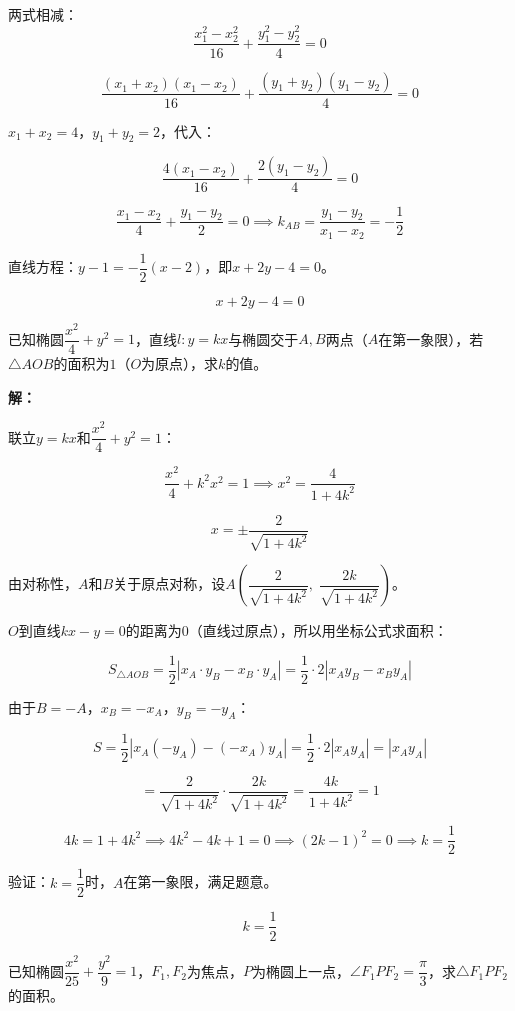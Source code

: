 \documentclass[12pt, a4paper]{ctexart}
\begin{document}
两式相减：
$$\frac{x_1^2 - x_2^2}{16} + \frac{y_1^2 - y_2^2}{4} = 0$$

$$\frac{(x_1+x_2)(x_1-x_2)}{16} + \frac{(y_1+y_2)(y_1-y_2)}{4} = 0$$

$x_1 + x_2 = 4$，$y_1 + y_2 = 2$，代入：

$$\frac{4(x_1 - x_2)}{16} + \frac{2(y_1 - y_2)}{4} = 0$$

$$\frac{x_1 - x_2}{4} + \frac{y_1 - y_2}{2} = 0 \implies k_{AB} = \frac{y_1 - y_2}{x_1 - x_2} = -\frac{1}{2}$$

直线方程：$y - 1 = -\dfrac{1}{2}(x - 2)$，即$x + 2y - 4 = 0$。

$$\boxed{x + 2y - 4 = 0}$$

\begin{examplebox}[【例题9】直线与椭圆交点的面积问题]
已知椭圆$\dfrac{x^2}{4} + y^2 = 1$，直线$l: y = kx$与椭圆交于$A, B$两点（$A$在第一象限），若$\triangle AOB$的面积为$1$（$O$为原点），求$k$的值。
\end{examplebox}

\textbf{解：}

联立$y = kx$和$\dfrac{x^2}{4} + y^2 = 1$：

$$\frac{x^2}{4} + k^2 x^2 = 1 \implies x^2 = \frac{4}{1 + 4k^2}$$

$$x = \pm\frac{2}{\sqrt{1 + 4k^2}}$$

由对称性，$A$和$B$关于原点对称，设$A\left(\dfrac{2}{\sqrt{1+4k^2}},\; \dfrac{2k}{\sqrt{1+4k^2}}\right)$。

$O$到直线$kx - y = 0$的距离为$0$（直线过原点），所以用坐标公式求面积：

$$S_{\triangle AOB} = \frac{1}{2}|x_A \cdot y_B - x_B \cdot y_A| = \frac{1}{2} \cdot 2|x_A y_B - x_B y_A|$$

由于$B = -A$，$x_B = -x_A$，$y_B = -y_A$：

$$S = \frac{1}{2}|x_A(-y_A) - (-x_A)y_A| = \frac{1}{2} \cdot 2|x_A y_A| = |x_A y_A|$$

$$= \frac{2}{\sqrt{1+4k^2}} \cdot \frac{2k}{\sqrt{1+4k^2}} = \frac{4k}{1+4k^2} = 1$$

$$4k = 1 + 4k^2 \implies 4k^2 - 4k + 1 = 0 \implies (2k - 1)^2 = 0 \implies k = \frac{1}{2}$$

验证：$k = \dfrac{1}{2}$时，$A$在第一象限，满足题意。

$$\boxed{k = \dfrac{1}{2}}$$

\begin{examplebox}[【例题10】椭圆焦点三角形的面积]
已知椭圆$\dfrac{x^2}{25} + \dfrac{y^2}{9} = 1$，$F_1, F_2$为焦点，$P$为椭圆上一点，$\angle F_1 P F_2 = \dfrac{\pi}{3}$，求$\triangle F_1 P F_2$的面积。
\end{examplebox}
\end{document}
